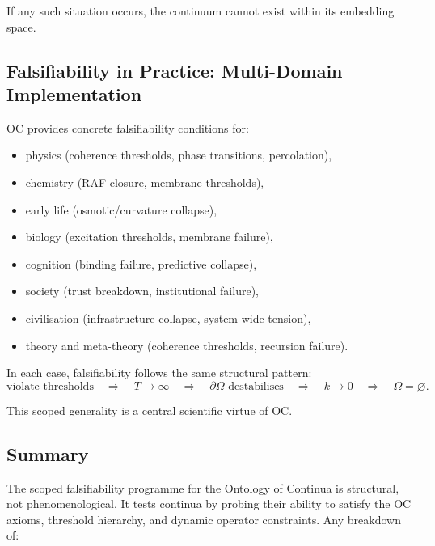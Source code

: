If any such situation occurs, the continuum cannot exist within its
embedding space.



\subsection{Falsifiability in Practice: Multi-Domain Implementation}

OC provides concrete falsifiability conditions for:

\begin{itemize}
    \item physics (coherence thresholds, phase transitions, percolation),
    \item chemistry (RAF closure, membrane thresholds),
    \item early life (osmotic/curvature collapse),
    \item biology (excitation thresholds, membrane failure),
    \item cognition (binding failure, predictive collapse),
    \item society (trust breakdown, institutional failure),
    \item civilisation (infrastructure collapse, system-wide tension),
    \item theory and meta-theory (coherence thresholds, recursion failure).
\end{itemize}

In each case, falsifiability follows the same structural pattern:
\[
\text{violate thresholds}
\quad \Rightarrow \quad
T \to \infty
\quad \Rightarrow \quad
\partial\Omega \text{ destabilises}
\quad \Rightarrow \quad
k \to 0
\quad \Rightarrow \quad
\Omega = \varnothing.
\]

This scoped generality is a central scientific virtue of OC.



\subsection{Summary}

The scoped falsifiability programme for the Ontology of Continua is
structural, not phenomenological.
It tests continua by probing their ability to satisfy the OC axioms,
threshold hierarchy, and dynamic operator constraints.
Any breakdown of:

